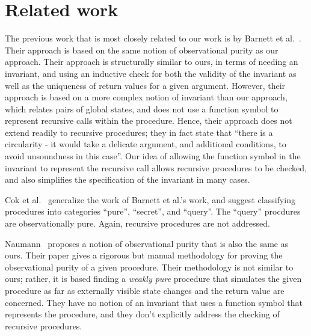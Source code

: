 \section{Related work}\label{sec:related}

The previous work that is most closely related to our work is by Barnett et
al.~\cite{barnett200499,barnett2006allowing}. Their approach is based on
the same notion of observational purity as our approach. Their approach is
structurally similar to ours, in terms of needing an invariant, and using
an inductive check for both the validity of the invariant as well as the
uniqueness of return values for a given argument.  However, their approach
is based on a more complex notion of invariant than our approach, which
relates pairs of global states, and does not use a function symbol to
represent recursive calls within the procedure. Hence, their approach does
not extend readily to recursive procedures; they in fact state that ``there
is a circularity - it would take a delicate argument, and additional
conditions, to avoid unsoundness in this case''. Our idea of allowing the
function symbol in the invariant to represent the recursive call allows
recursive procedures to be checked, and also simplifies the specification
of the invariant in many cases. 

Cok et al.~\cite{cok2008extensions}  generalize the work of Barnett
et al.'s work, and suggest classifying procedures into categories ``pure'',
``secret'', and ``query''. The ``query'' procdures are observationally
pure. Again, recursive procedures are not addressed.

Naumann~\cite{naumann2007observational} proposes a notion of observational
purity that is also the same as ours. Their paper gives a rigorous but manual
methodology for proving the observational purity of a
given procedure. Their methodology is not similar to ours; rather, it is
based finding a \emph{weakly pure} procedure that simulates the given
procedure as far as externally visible state changes and the return value
are concerned. They have no notion of an invariant that uses a function
symbol that represents the procedure, and they don't explicitly address the
checking of recursive procedures.

